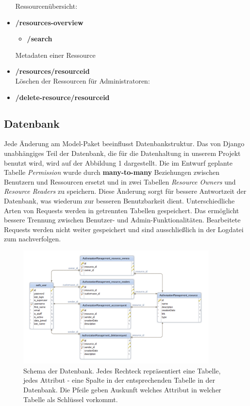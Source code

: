 \documentclass[parskip=full,11pt]{scrartcl}
\begin{document}
\begin{itemize}[itemsep=0pt]
\noindent Ressourcenübersicht:
\item \textbf{/resources-overview}
	\begin{itemize}
	\item \textbf{/search}\\
	\end{itemize}
	
\noindent Metadaten einer Ressource
\item \textbf{/resources/resourceid}\\

\noindent Löschen der Ressourcen für Administratoren:
\item \textbf{/delete-resource/resourceid}
\end{itemize}
 
\newpage 
\subsection{Datenbank}
Jede Änderung am Model-Paket beeinflusst Datenbankstruktur. Das von Django unabhängiges Teil der Datenbank, die für die Datenhaltung in unserem Projekt benutzt wird, wird auf der Abbildung 1 dargestellt. Die im Entwurf geplante Tabelle \textit{Permission} wurde durch \textbf{many-to-many} Beziehungen zwischen Benutzern und Ressourcen ersetzt und in zwei Tabellen \textit{Resource Owners} und \textit{Resource Readers} zu speichern. Diese Änderung sorgt für bessere Antwortzeit der Datenbank, was wiederum zur besseren Benutzbarkeit dient.
Unterschiedliche Arten von Requests werden in getrennten Tabellen gespeichert. Das ermöglicht bessere Trennung zwischen Benutzer- und Admin-Funktionalitäten. Bearbeitete Requests werden nicht weiter gespeichert und sind ausschließlich in der Logdatei zum nachverfolgen.    
 \begin{figure}[ht!]
 	\centering
 	\includegraphics[width=0.9\textwidth]{res/database.png}
 	\caption{Schema der Datenbank. Jedes Rechteck repräsentiert eine Tabelle,
jedes Attribut - eine Spalte in der entsprechenden Tabelle in der Datenbank. Die
Pfeile geben Auskunft welches Attribut in welcher Tabelle als Schlüssel vorkommt.}
 \end{figure}
\end{document}
